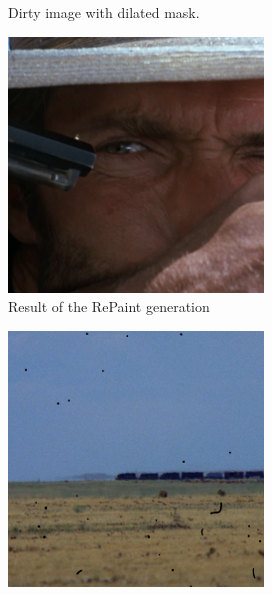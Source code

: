 \documentclass[openany, 12pt]{article}
\begin{document}
{\begin{figure}[htbp]
\begin{minipage}{0.45\textwidth}
		\caption{\smaller Dirty image with dilated mask.}
	\end{minipage}
	\hspace{0.05\textwidth}
	\begin{minipage}{0.45\textwidth}
		\centering
		\includegraphics[width=\textwidth]{images/inpainted_3.png}
		\caption{Result of the RePaint generation}
	\end{minipage}
\end{figure}
\begin{figure}[htbp]
	\centering
	\begin{minipage}{0.45\textwidth}
		\centering
		\includegraphics[width=\textwidth]{images/masked_2.png}

\end{minipage}
\end{figure}}
\end{document}
